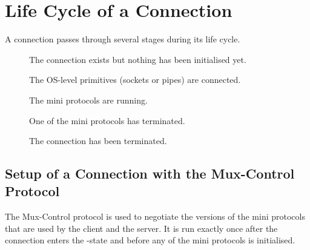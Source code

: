 \documentclass{report}
\newcommand{\msg}[1]{\texttt{#1}}
\theoremstyle{definition}{
  \newtheorem{lemma}{Lemma}[section] %
  \newtheorem{definition}[lemma]{Definition}
}
\theoremstyle{theorem}{
  \newtheorem{invariant}[lemma]{Invariant}
  \newtheorem{proofobligation}[lemma]{Proof Obligation}
}
\numberwithin{equation}{lemma}
\begin{document}
\section{Life Cycle of a Connection}



A connection passes through several stages during its life cycle.
\begin{description}
\item[\Larval]    The connection exists but nothing has been initialised yet.
\item[\Connected] The OS-level primitives (sockets or pipes) are connected.
\item[\Mature] The mini protocols are running.
\item[\Dying]  One of the mini protocols has terminated.
\item[\Dead] The connection has been terminated.
\end{description}

\newcommand{\InitReq}{\msg{InitReq}}
\newcommand{\InitRsp}{\msg{InitRsp}}
\newcommand{\InitFail}{\msg{InitFail}}

\subsection{Setup of a Connection with the Mux-Control Protocol}
The Mux-Control protocol is used to negotiate the versions of the mini
protocols that are used by the client and the server.
It is run exactly once after the connection enters the \Connected-state and before
any of the mini protocols is initialised.
\end{document}
